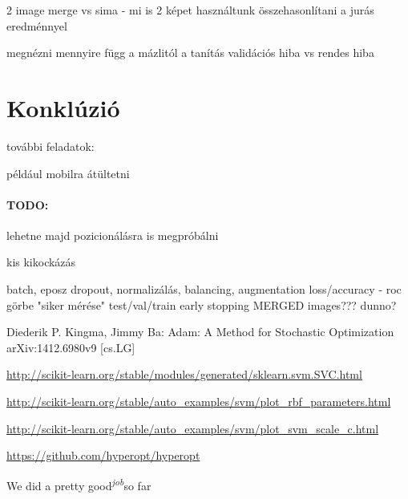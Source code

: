 2 image merge vs sima - mi is 2 képet használtunk
összehasonlítani a jurás eredménnyel

megnézni mennyire függ a mázlitól a tanítás
validációs hiba vs rendes hiba


\newpage
\section{Konklúzió}

további feladatok:

például mobilra átültetni


\paragraph{TODO:}

lehetne majd pozicionálásra is megpróbálni


kis kikockázás

batch, eposz
dropout, normalizálás, balancing, augmentation
loss/accuracy - roc görbe "siker mérése"
test/val/train
early stopping
MERGED images??? dunno?



\newpage
\begin{thebibliography}{9}
	Diederik P. Kingma, Jimmy Ba:
	Adam: A Method for Stochastic Optimization
	arXiv:1412.6980v9 [cs.LG]

	\url{http://scikit-learn.org/stable/modules/generated/sklearn.svm.SVC.html}
	
	\url{http://scikit-learn.org/stable/auto_examples/svm/plot_rbf_parameters.html}
	
	\url{http://scikit-learn.org/stable/auto_examples/svm/plot_svm_scale_c.html}
	
	\url{https://github.com/hyperopt/hyperopt}
	


	
\end{thebibliography}




We did a pretty good\textsuperscript{\textit{job}}so far



